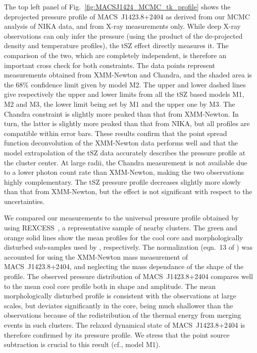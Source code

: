 \documentclass[twocolumn,traditabstract]{aa}
\newcommand{\rexcess}{{\gwpfont REXCESS}}
\begin{document}
The top left panel of Fig.~\ref{fig:MACSJ1424_MCMC_tk_profile} shows the deprojected pressure profile of \mbox{MACS~J1423.8+2404} as derived from our MCMC analysis of NIKA data, and from X-ray measurements only. While deep X-ray observations can only infer the pressure (using the product of the de-projected density and temperature profiles), the tSZ effect directly measures it. The comparison of the two, which are completely independent, is therefore an important cross check for both constraints. The data points represent measurements obtained from XMM-Newton and Chandra, and the shaded area is the 68\% confidence limit given by model M2. The upper and lower dashed lines give respectively the upper and lower limits from all the tSZ based models M1, M2 and M3, the lower limit being set by M1 and the upper one by M3. The Chandra constraint is slightly more peaked than that from XMM-Newton. In turn, the latter is slightly more peaked than that from NIKA, but all profiles are compatible within error bars. These results confirm that the point spread function deconvolution of the XMM-Newton data performs well and that the model extrapolation of the tSZ data accurately describes the pressure profile at the cluster center. At large radii, the Chandra measurement is not available due to a lower photon count rate  than XMM-Newton, making the two observations highly complementary. The tSZ  pressure profile decreases slightly more slowly than that from XMM-Newton, but the effect is not significant with respect to the uncertainties. 

We compared our measurements to the universal pressure profile obtained by \cite{arnaud2010} using  \rexcess\  \citep{bohringer2007}, a representative sample of nearby clusters. The green and orange solid lines show the mean profiles for the cool core and morphologically disturbed sub-samples used by \cite{arnaud2010}, respectively. The normalization (eqn.~13 of \cite{arnaud2010}) was accounted for using the XMM-Newton mass measurement of \mbox{MACS~J1423.8+2404}, and neglecting the mass dependance of the shape of the profile. The observed pressure distribution of  \mbox{MACS~J1423.8+2404} compares well to the mean cool core profile both in shape and amplitude. The mean morphologically disturbed profile is consistent with the observations at large scales, but deviates significantly in the core, being much shallower than the observations because of the redistribution of the thermal energy from merging events in such clusters. The relaxed dynamical state of \mbox{MACS~J1423.8+2404} is therefore confirmed by its pressure profile. We stress that the point source subtraction is crucial to this result (cf., model M1).
\end{document}
